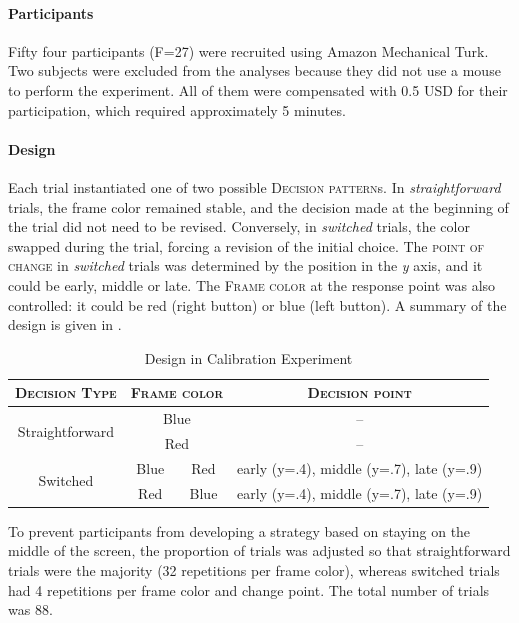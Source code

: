 \documentclass{article}
\begin{document}
\paragraph{Participants} Fifty four participants (F=27) were recruited using Amazon Mechanical Turk. Two subjects were excluded from the analyses because they did not use a mouse to perform the experiment. All of them were compensated with 0.5 USD for their participation, which required approximately 5 minutes. 

\paragraph{Design}
Each trial instantiated one of two possible \textsc{Decision pattern}s. In \textit{straightforward} trials, the frame color remained stable, and the decision made at the beginning of the trial did not need to be revised. Conversely, in \textit{switched} trials, the color swapped during the trial, forcing a revision of the initial choice. 
The \textsc{point of change} in \textit{switched} trials was determined by the position in the \textit{y} axis, and it could be early, middle or late. 
The \textsc{Frame color} at the response point was also controlled: it could be red (right button) or blue (left button).    
A summary of the design is given in . 


\begin{table}[!h]
\centering
\begin{tabular}{cccc}
\textsc{Decision Type}&\multicolumn{2}{c}{\textsc{Frame color}}&\textsc{Decision point}\\
\hline
\multirow{2}{*}{Straightforward} & \multicolumn{2}{c}{Blue} & -- \\
& \multicolumn{2}{c}{Red} & -- \\
\hline
\multirow{2}{*}{Switched} &Blue & Red & early (y=.4), middle (y=.7), late (y=.9) \\
 &  Red &  Blue & early (y=.4), middle (y=.7), late (y=.9) \\
\hline
\end{tabular}
\caption{Design in Calibration Experiment}
\label{tab:design.validation}
\end{table}

To prevent participants from developing a strategy based on staying on the middle of the screen, the proportion of trials was adjusted so that straightforward trials were the majority (32 repetitions per frame color), whereas switched trials had 4 repetitions per frame color and change point. The total number of trials was 88.  
\end{document}
